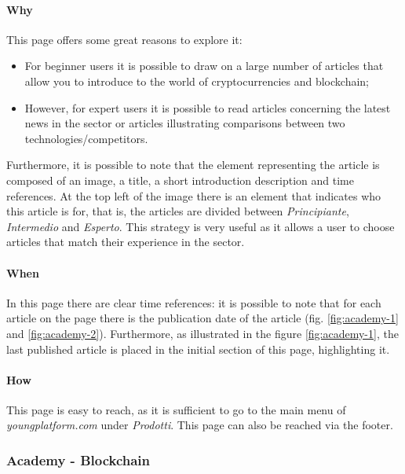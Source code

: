 \paragraph{Why}

This page offers some great reasons to explore it:
\begin{itemize}
  \item For beginner users it is possible to draw on a large number of 
  articles that allow you to introduce to the world of cryptocurrencies 
  and blockchain;

  \item However, for expert users it is possible to read articles 
  concerning the latest news in the sector or articles illustrating 
  comparisons between two technologies/competitors.
\end{itemize}

Furthermore, it is possible to note that the element representing the 
article is composed of an image, a title, a short introduction description 
and time references. At the top left of the image there is an element 
that indicates who this article is for, that is, the articles are divided 
between \textit{Principiante}, \textit{Intermedio} and \textit{Esperto}. 
This strategy is very useful as it allows a user to choose articles that 
match their experience in the sector.

\paragraph{When}

In this page there are clear time references: it is possible to note that 
for each article on the page there is the publication date of the article 
(fig. \ref{fig:academy-1} and \ref{fig:academy-2}). Furthermore, as 
illustrated in the figure \ref{fig:academy-1}, the last published article 
is placed in the initial section of this page, highlighting it.

\paragraph{How}

This page is easy to reach, as it is sufficient to go to the main menu of 
\textit{youngplatform.com} under \textit{Prodotti}. This page can also be 
reached via the footer.

\subsubsection{Academy - Blockchain}

